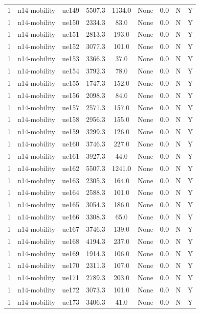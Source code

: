 \begin{table}[ht]
\begin{tabular}{|c|c|c|c|c|c|c|c|c|}
1 & n14-mobility & ue149 & 5507.3 & 1134.0 & None & 0.0 & N & Y \\
1 & n14-mobility & ue150 & 2334.3 & 83.0 & None & 0.0 & N & Y \\
1 & n14-mobility & ue151 & 2813.3 & 193.0 & None & 0.0 & N & Y \\
1 & n14-mobility & ue152 & 3077.3 & 101.0 & None & 0.0 & N & Y \\
1 & n14-mobility & ue153 & 3366.3 & 37.0 & None & 0.0 & N & Y \\
1 & n14-mobility & ue154 & 3792.3 & 78.0 & None & 0.0 & N & Y \\
1 & n14-mobility & ue155 & 1747.3 & 152.0 & None & 0.0 & N & Y \\
1 & n14-mobility & ue156 & 2098.3 & 84.0 & None & 0.0 & N & Y \\
1 & n14-mobility & ue157 & 2571.3 & 157.0 & None & 0.0 & N & Y \\
1 & n14-mobility & ue158 & 2956.3 & 155.0 & None & 0.0 & N & Y \\
1 & n14-mobility & ue159 & 3299.3 & 126.0 & None & 0.0 & N & Y \\
1 & n14-mobility & ue160 & 3746.3 & 227.0 & None & 0.0 & N & Y \\
1 & n14-mobility & ue161 & 3927.3 & 44.0 & None & 0.0 & N & Y \\
1 & n14-mobility & ue162 & 5507.3 & 1241.0 & None & 0.0 & N & Y \\
1 & n14-mobility & ue163 & 2305.3 & 164.0 & None & 0.0 & N & Y \\
1 & n14-mobility & ue164 & 2588.3 & 101.0 & None & 0.0 & N & Y \\
1 & n14-mobility & ue165 & 3054.3 & 186.0 & None & 0.0 & N & Y \\
1 & n14-mobility & ue166 & 3308.3 & 65.0 & None & 0.0 & N & Y \\
1 & n14-mobility & ue167 & 3746.3 & 139.0 & None & 0.0 & N & Y \\
1 & n14-mobility & ue168 & 4194.3 & 237.0 & None & 0.0 & N & Y \\
1 & n14-mobility & ue169 & 1914.3 & 106.0 & None & 0.0 & N & Y \\
1 & n14-mobility & ue170 & 2311.3 & 107.0 & None & 0.0 & N & Y \\
1 & n14-mobility & ue171 & 2789.3 & 203.0 & None & 0.0 & N & Y \\
1 & n14-mobility & ue172 & 3073.3 & 101.0 & None & 0.0 & N & Y \\
1 & n14-mobility & ue173 & 3406.3 & 41.0 & None & 0.0 & N & Y \\

\end{tabular}
\end{table}
